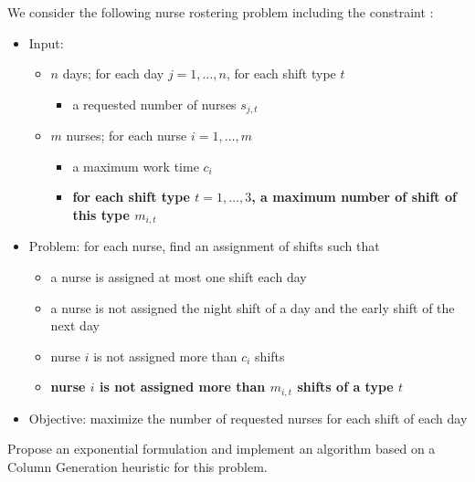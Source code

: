 \documentclass[a4paper,twocolumn]{article}
\begin{document}
We consider the following nurse rostering problem including the constraint :
\begin{itemize}
  \item Input:
    \begin{itemize}
      \item $n$ days; for each day $j = 1, \dots, n$, for each shift type $t$
        \begin{itemize}
          \item a requested number of nurses $s_{j, t}$
        \end{itemize}
      \item $m$ nurses; for each nurse $i = 1, \dots, m$
        \begin{itemize}
          \item a maximum work time $c_i$
          \item \textbf{for each shift type $t = 1, \dots, 3$, a maximum number of shift of this type $m_{i, t}$}
        \end{itemize}
    \end{itemize}
  \item Problem: for each nurse, find an assignment of shifts such that
    \begin{itemize}
      \item a nurse is assigned at most one shift each day
      \item a nurse is not assigned the night shift of a day and the early shift of the next day
      \item nurse $i$ is not assigned more than $c_i$ shifts
      \item \textbf{nurse $i$ is not assigned more than $m_{i, t}$ shifts of a type $t$}
    \end{itemize}
  \item Objective: maximize the number of requested nurses for each shift of each day
\end{itemize}


Propose an exponential formulation and implement an algorithm based on a Column Generation heuristic for this problem.
\end{document}
